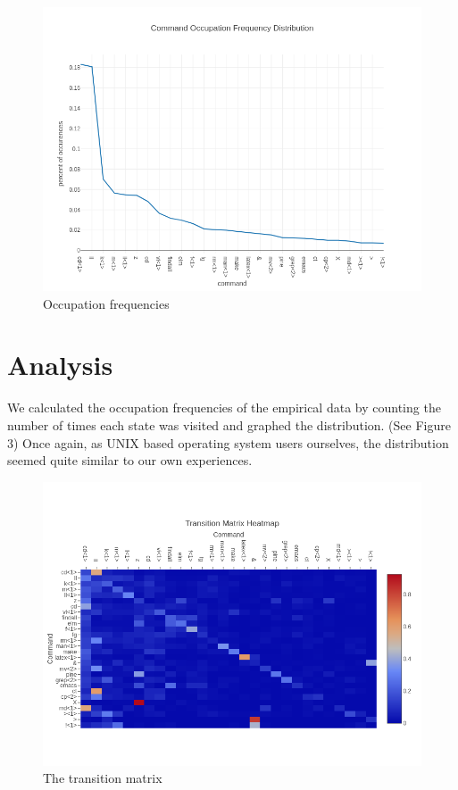 \documentclass[10pt]{article}
\begin{document}
\begin{figure}[!htb]
  \centering
  \includegraphics[scale=.50]{../pictures/empirical-occ-freq-dist.png}
  \caption{Occupation frequencies}
\end{figure}
\newpage
\section{Analysis}

We calculated the occupation frequencies of the empirical data by counting the
number of times each state was visited and graphed the distribution. (See Figure
$3$) Once again, as UNIX based operating system users ourselves, the
distribution seemed quite similar to our own experiences.

\begin{figure}[!htb]
  \centering
  \includegraphics[scale=.50]{../pictures/transition-matrix-heatmap.png}
  \caption{The transition matrix}
\end{figure}
\end{document}
